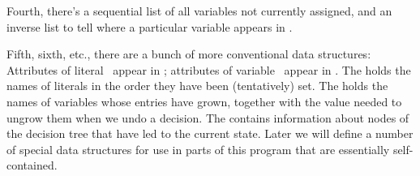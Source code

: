 Fourth, there's a sequential list  of all variables not
currently
assigned, and an inverse list  to tell where a particular
variable
appears in .

Fifth, sixth, etc., there are a bunch of more conventional data structures:
Attributes of literal~ appear in ; attributes of
variable~
appear in .
The  holds the names of literals in the order they have been
(tentatively) set. The  holds the names of variables whose 
entries have grown, together with the value needed to ungrow them
when we undo a decision. The  contains information about nodes
of the decision tree that have led to the current state.
Later we will define a number of special data structures for use in
parts of this program that are essentially self-contained.

